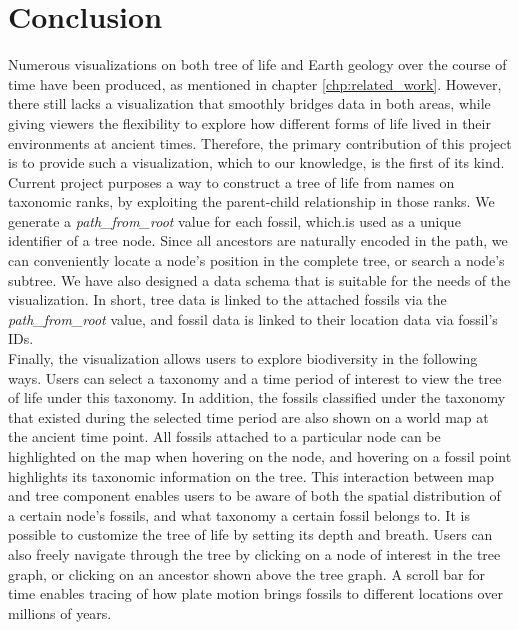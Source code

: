 \documentclass[11pt, a4paper,oneside,chapterprefix=false]{scrbook}
\begin{document}
\chapter{Conclusion} \label{chp:conclusion}
Numerous visualizations on both tree of life and Earth geology over the course of time have been produced, as mentioned in chapter \ref{chp:related_work}. However, there still lacks a visualization that smoothly bridges data in both areas, while giving viewers the flexibility to explore how different forms of life lived in their environments at ancient times. Therefore, the primary contribution of this project is to provide such a visualization, which to our knowledge, is the first of its kind. \\

Current project purposes a way to construct a tree of life from names on taxonomic ranks, by exploiting the parent-child relationship in those ranks. We generate a \emph{path\_from\_root} value for each fossil, which.is used as a unique identifier of a tree node. Since all ancestors are naturally encoded in the path, we can conveniently locate a node's position in the complete tree, or search a node's subtree. We have also designed a data schema that is suitable for the needs of the visualization. In short, tree data is linked to the attached fossils via the \emph{path\_from\_root} value, and fossil data is linked to their location data via fossil's IDs. \\

Finally, the visualization allows users to explore biodiversity in the following ways. Users can select a taxonomy and a time period of interest to view the tree of life under this taxonomy. In addition, the fossils classified under the taxonomy that existed during the selected time period are also shown on a world map at the ancient time point. All fossils attached to a particular node can be highlighted on the map when hovering on the node, and hovering on a fossil point highlights its taxonomic information on the tree. This interaction between map and tree component enables users to be aware of both the spatial distribution of a certain node's fossils, and what taxonomy a certain fossil belongs to. It is possible to customize the tree of life by setting its depth and breath. Users can also freely navigate through the tree by clicking on a node of interest in the tree graph, or clicking on an ancestor shown above the tree graph. A scroll bar for time enables tracing of how plate motion brings fossils to different locations over millions of years. \\
\end{document}
